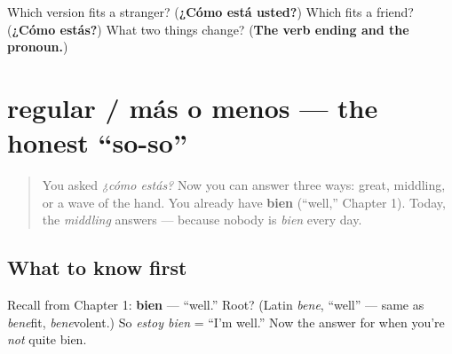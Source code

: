 \begin{tcolorbox}[breakable,colback=teal!4,colframe=teal!35!black,title={Before you move on}]
Which version fits a stranger? (\textbf{¿Cómo está usted?}) Which fits a friend? (\textbf{¿Cómo estás?}) What two things change? (\textbf{The verb ending and the pronoun.})
\end{tcolorbox}
\section[regular]{regular / más o menos — the honest \textquotedblleft{}so-so\textquotedblright{}}

\label{lesson:ES-C04-regular}



\begin{quote}
You asked \emph{¿cómo estás?} Now you can answer three ways: great, middling, or a wave of the hand. You already have \textbf{bien} (\textquotedblleft{}well,\textquotedblright{} Chapter 1). Today, the \emph{middling} answers — because nobody is \emph{bien} every day.
\end{quote}

\subsection*{What to know first}
Recall from Chapter 1: \textbf{bien} — \textquotedblleft{}well.\textquotedblright{} Root? (Latin \emph{bene}, \textquotedblleft{}well\textquotedblright{} — same as \emph{bene}fit, \emph{bene}volent.) So \emph{estoy bien} = \textquotedblleft{}I'm well.\textquotedblright{} Now the answer for when you're \emph{not} quite bien.


